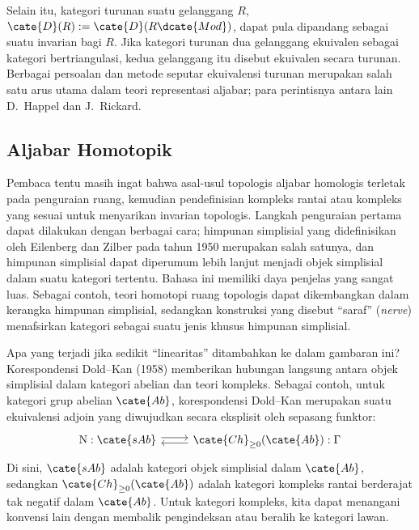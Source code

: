 Selain itu, kategori turunan suatu gelanggang $R$,
$\cate{D}(R) := \cate{D}(R\dcate{Mod})$, dapat pula dipandang sebagai
suatu invarian bagi $R$. Jika kategori turunan dua gelanggang ekuivalen
sebagai kategori bertriangulasi, kedua gelanggang itu disebut ekuivalen
secara turunan. Berbagai persoalan dan metode seputar ekuivalensi turunan
merupakan salah satu arus utama dalam teori representasi aljabar; para
perintisnya antara lain D.\ Happel dan J.\ Rickard.

\subsection*{Aljabar Homotopik}

Pembaca tentu masih ingat bahwa asal-usul topologis aljabar homologis
terletak pada penguraian ruang, kemudian pendefinisian kompleks rantai atau
kompleks yang sesuai untuk menyarikan invarian topologis. Langkah penguraian
pertama dapat dilakukan dengan berbagai cara; himpunan simplisial yang didefinisikan
oleh Eilenberg dan Zilber pada tahun 1950 merupakan salah satunya, dan
himpunan simplisial dapat diperumum lebih lanjut menjadi objek simplisial
dalam suatu kategori tertentu. Bahasa ini memiliki daya penjelas yang
sangat luas. Sebagai contoh, teori homotopi ruang topologis dapat
dikembangkan dalam kerangka himpunan simplisial, sedangkan konstruksi yang
disebut ``saraf'' (\emph{nerve}) menafsirkan kategori sebagai suatu jenis
khusus himpunan simplisial.

Apa yang terjadi jika sedikit ``linearitas'' ditambahkan ke dalam gambaran
ini? Korespondensi Dold--Kan (1958) memberikan hubungan langsung antara
objek simplisial dalam kategori abelian dan teori kompleks. Sebagai
contoh, untuk kategori grup abelian $\cate{Ab}$, korespondensi Dold--Kan
merupakan suatu ekuivalensi adjoin yang diwujudkan secara eksplisit oleh
sepasang funktor:
\[\begin{tikzcd}
	\mathrm{N}: \cate{sAb} \arrow[shift left, r] & \cate{Ch}_{\geq 0}(\cate{Ab}): \Gamma \arrow[shift left, l]
\end{tikzcd}\]
Di sini, $\cate{sAb}$ adalah kategori objek simplisial dalam $\cate{Ab}$,
sedangkan $\cate{Ch}_{\geq 0}(\cate{Ab})$ adalah kategori kompleks rantai
berderajat tak negatif dalam $\cate{Ab}$. Untuk kategori kompleks, kita
dapat menangani konvensi lain dengan membalik pengindeksan atau beralih ke
kategori lawan.

